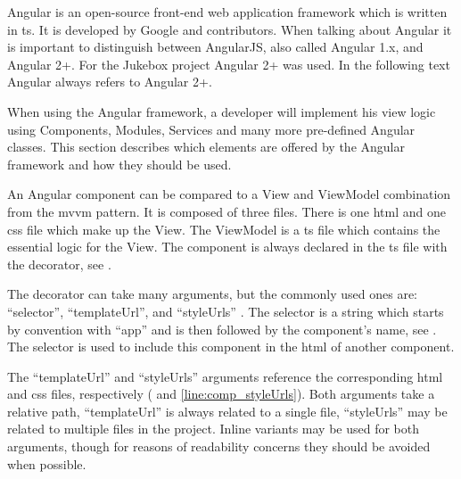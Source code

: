 

Angular is an open-source front-end web application framework which is written in \gls{ts}. It is developed by Google and contributors. When talking about Angular it is important to distinguish between AngularJS, also called Angular 1.x, and Angular 2+. For the Jukebox project Angular 2+ was used. In the following text Angular always refers to Angular 2+.


When using the Angular framework, a developer will implement his view logic using Components, Modules, Services and many more pre-defined Angular classes. This section describes which elements are offered by the Angular framework and how they should be used.


An Angular component can be compared to a View and ViewModel combination from the \gls{mvvm} pattern. It is composed of three files. There is one \gls{html} and one \gls{css} file which make up the View. The ViewModel is a \gls{ts} file which contains the essential logic for the View. The component is always declared in the \gls{ts} file with the  decorator, see .

The  decorator can take many arguments, but the commonly used ones are: \enquote{selector}, \enquote{templateUrl}, and \enquote{styleUrls} \cite{ngcomponent}. The selector is a string which starts by convention with \enquote{app} and is then followed by the component's name, see . The selector is used to include this component in the \gls{html} of another component.

The \enquote{templateUrl} and \enquote{styleUrls} arguments reference the corresponding \gls{html} and \gls{css} files, respectively ( and \ref{line:comp_styleUrls}). Both arguments take a relative path, \enquote{templateUrl} is always related to a single file, \enquote{styleUrls} may be related to multiple files in the project. Inline variants may be used for both arguments, though for reasons of readability concerns they should be avoided when possible.



